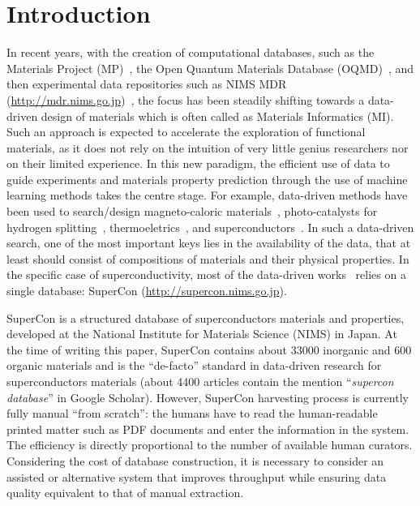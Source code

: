 \documentclass[]{interact}
\theoremstyle{plain}%
\theoremstyle{definition}
\theoremstyle{remark}
\begin{document}
\section{Introduction}
In recent years, with the creation of computational databases, such as the Materials Project (MP)~\cite{materialsprojectJain2013}, the Open Quantum Materials Database (OQMD)~\cite{oqmdkirklin2015open}, and then experimental data repositories such as NIMS MDR (\url{http://mdr.nims.go.jp})~\cite{ranganathan_anusha_2019_3553963}, the focus has been steadily shifting towards a data-driven design of materials which is often called as Materials Informatics (MI).
Such an approach is expected to accelerate the exploration of functional materials, as it does not rely on the intuition of very little genius researchers nor on their limited experience.
In this new paradigm, the efficient use of data to guide experiments and materials property prediction through the use of machine learning methods takes the centre stage.
For example, data-driven methods have been used to search/design magneto-caloric materials~\cite{Bocarsly2017,Castro2020-12,court2021inverse}, photo-catalysts for hydrogen splitting~\cite{xiong2021optimizing}, thermoeletrics~\cite{iwasaki2019machine}, and superconductors~\cite{stanev_machine_2017}.
In such a data-driven search, one of the most important keys lies in the availability of the data, that at least should consist of compositions of materials and their physical properties.
In the specific case of superconductivity, most of the data-driven works~\cite{stanev_machine_2017, le2020critical,Hamlin2019SuperconductivityNR} relies on a single database: SuperCon (\url{http://supercon.nims.go.jp}).

SuperCon is a structured database of superconductors materials and properties, developed at the National Institute for Materials Science (NIMS) in Japan.
At the time of writing this paper, SuperCon contains about 33000 inorganic and 600 organic materials and is the ``de-facto'' standard in data-driven research for superconductors materials  (about 4400 articles contain the mention ``\textit{supercon database}'' in Google Scholar).
However, SuperCon harvesting process is currently fully manual ``from scratch'': the humans have to read the human-readable printed matter such as PDF documents and enter the information in the system.
The efficiency is directly proportional to the number of available human curators.
Considering the cost of database construction, it is necessary to consider an assisted or alternative system that improves throughput while ensuring data quality equivalent to that of manual extraction.
\end{document}
